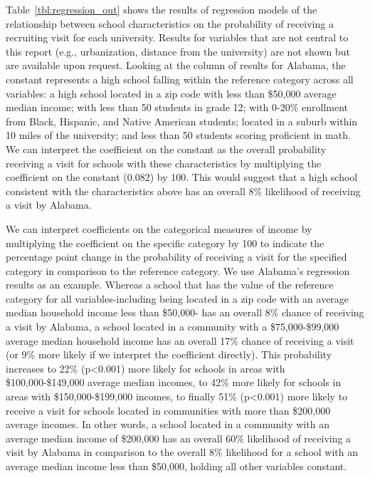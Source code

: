 \documentclass[twoside]{article}
\begin{document}
Table~\ref{tbl:regression_out} shows the results of regression models of the relationship between school characteristics on the probability of receiving a recruiting visit for each university. Results for variables that are not central to this report (e.g., urbanization, distance from the university) are not shown but are available upon request. Looking at the column of results for Alabama, the constant represents a high school falling within the reference category across all variables: a high school located in a zip code with less than \$50,000 average median income; with less than 50 students in grade 12; with 0-20\% enrollment from Black, Hispanic, and Native American students; located in a suburb within 10 miles of the university; and less than 50 students scoring proficient in math.  We can interpret the coefficient on the constant as the overall probability receiving a visit for schools with these characteristics by multiplying the coefficient on the constant (0.082) by 100. This would suggest that a high school consistent with the characteristics above has an overall 8\% likelihood of receiving a visit by Alabama.



We can interpret coefficients on the categorical measures of income by multiplying the coefficient on the specific category by 100 to indicate the percentage point change in the probability of receiving a visit for the specified category in comparison to the reference category. We use Alabama's regression results as an example. Whereas a school that has the value of the reference category for all variables-including being located in a zip code with an average median household income less than \$50,000- has an overall 8\% chance of receiving a visit by Alabama, a school located in a community with a \$75,000-\$99,000 average median household income has an overall 17\% chance of receiving a visit (or 9\% more likely if we interpret the coefficient directly). This probability increases to 22\% (p<0.001) more likely for schools in areas with \$100,000-\$149,000 average median incomes, to 42\% more likely for schools in areas with \$150,000-\$199,000 incomes, to finally 51\% (p<0.001) more likely to receive a visit for schools located in communities with more than \$200,000 average incomes. In other words, a school located in a community with an average median income of \$200,000 has an overall 60\% likelihood of receiving a visit by Alabama in comparison to the overall 8\% likelihood for a school with an average median income less than \$50,000, holding all other variables constant.
\end{document}

